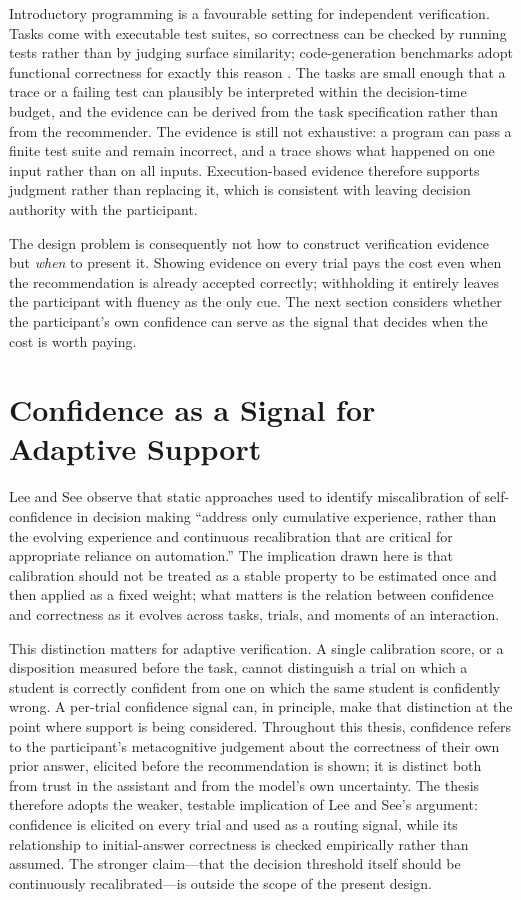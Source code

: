 \documentclass[oneside,final,14pt,a4paper]{extreport}
\begin{document}
Introductory programming is a favourable setting for independent verification.
Tasks come with executable test suites, so correctness can be checked by
running tests rather than by judging surface similarity; code-generation
benchmarks adopt functional correctness for exactly this reason
\cite{Liu2023EvalPlus}. The tasks are small enough that a trace or a failing test
can plausibly be interpreted within the decision-time budget, and the evidence
can be derived from the task specification rather than from the recommender. The
evidence is still not exhaustive: a program can pass a finite test suite and
remain incorrect, and a trace shows what happened on one input rather than on
all inputs. Execution-based
evidence therefore supports judgment rather than replacing it, which is
consistent with leaving decision authority with the participant.

The design problem is consequently not how to construct verification evidence
but \emph{when} to present it. Showing evidence on every trial pays the cost
even when the recommendation is already accepted correctly; withholding it
entirely leaves the participant with fluency as the only cue. The next section
considers whether the participant's own confidence can serve as the signal that
decides when the cost is worth paying.

\section{Confidence as a Signal for Adaptive Support}
\label{sec:lit-confidence}

Lee and See \cite[70]{LeeSee2004} observe that static approaches used to
identify miscalibration of self-confidence in decision making ``address only
cumulative experience, rather than the evolving experience and continuous
recalibration that are critical for appropriate reliance on automation.'' The
implication drawn here is that calibration should not be treated as a stable
property to be estimated once and then applied as a fixed weight; what matters is
the relation between confidence and correctness as it evolves across tasks,
trials, and moments of an interaction.

This distinction matters for adaptive verification. A single calibration score,
or a disposition measured before the task, cannot distinguish a trial on which a
student is correctly confident from one on which the same student is confidently
wrong. A per-trial confidence signal can, in principle, make that distinction at
the point where support is being considered. Throughout this thesis, confidence
refers to the participant's metacognitive judgement about the correctness of
their own prior answer, elicited before the recommendation is shown; it is
distinct both from trust in the assistant \cite{LeeSee2004} and from the model's
own uncertainty. The thesis therefore adopts the weaker, testable implication of
Lee and See's argument: confidence is elicited on every trial and used as a
routing signal, while its relationship to initial-answer correctness is checked
empirically rather than assumed. The stronger claim---that the decision
threshold itself should be continuously recalibrated---is outside the scope of
the present design.
\end{document}
